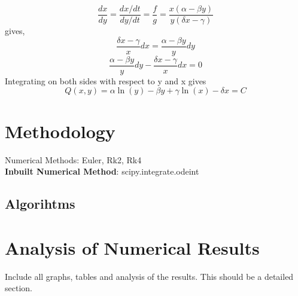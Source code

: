 \documentclass[12pt]{article}
\begin{document}
\begin{equation*}
    \frac { d x } { d y } = \frac { d x / d t } { d y / d t } = \frac { f } { g } = \frac  { x(\alpha  - \beta  y)} { y(\delta x  - \gamma )}
\end{equation*}
gives,
\begin{equation*}
    \frac { \delta x - \gamma}{x}  d x = \frac  {\alpha - \beta y }{ y } d y
\end{equation*}
\begin{equation*}
     \frac  {\alpha - \beta y }{ y } d y - \frac { \delta x - \gamma}{x}  d x = 0
\end{equation*}
Integrating on both sides with respect to y and x gives
\begin{equation*}
      Q(x,y) = \alpha \ln ( y ) - \beta y + \gamma \ln ( x ) - \delta x   = C
\end{equation*}


\newpage
\section{Methodology}
\label{sec:method}
Numerical Methods: Euler, Rk2, Rk4\\
\textbf{Inbuilt Numerical Method}: scipy.integrate.odeint \cite{noauthor_scipyintegrateodeint_nodate}

\subsection{Algorihtms}


\newpage
\section{Analysis of Numerical Results}
Include all graphs, tables and analysis of the results. This should be a detailed section. 
\end{document}
